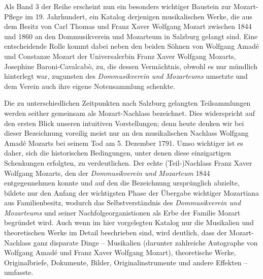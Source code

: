 Als Band 3 der Reihe erscheint nun ein besonders wichtiger Baustein zur Mozart-Pflege im 19. Jahrhundert, ein Katalog derjenigen musikalischen Werke, die aus dem Besitz von Carl Thomas und Franz Xaver Wolfgang Mozart zwischen 1844 und 1860 an den Dommusikverein und Mozarteum in Salzburg gelangt sind. Eine entscheidende Rolle kommt dabei neben den beiden Söhnen von Wolfgang Amadé und Constanze Mozart der Universalerbin Franz Xaver Wolfgang Mozarts, Josephine Baroni-Cavalcabò, zu, die dessen Vermächtnis, obwohl es nur mündlich hinterlegt war, zugunsten des \textit{Dommusikverein und Mozarteums} umsetzte und dem Verein auch ihre eigene Notensammlung schenkte.

Die zu unterschiedlichen Zeitpunkten nach Salzburg gelangten Teilsammlungen werden seither gemeinsam als \glqq Mozart-Nachlass\grqq{} bezeichnet. Dies widerspricht auf den ersten Blick unseren intuitiven Vorstellungen; denn heute denken wir bei dieser Bezeichnung voreilig meist nur an den musikalischen Nachlass Wolfgang Amadé Mozarts bei seinem Tod am 5. Dezember 1791. Umso wichtiger ist es daher, sich die historischen Bedingungen, unter denen diese einzigartigen Schenkungen erfolgten, zu verdeutlichen. Der \glqq echte (Teil-)Nachlass\grqq{} Franz Xaver Wolfgang Mozarts, den der \textit{Dommusikverein und Mozarteum} 1844 entgegennehmen konnte und auf den die Bezeichnung ursprünglich abzielte, bildete nur den Anfang der wichtigsten Phase der Übergabe wichtiger Mozartiana aus Familienbesitz, wodurch das Selbstverständnis des \textit{Dommusikverein und Mozarteums} und seiner Nachfolgeorganistionen als \glqq Erbe\grqq{} der Familie Mozart begründet wird. Auch wenn im hier vorgelegten Katalog nur die Musikalien und theoretischen Werke im Detail beschrieben sind, wird deutlich, dass der \glqq Mozart-Nachlass\grqq{} ganz disparate Dinge – Musikalien (darunter zahlreiche Autographe von Wolfgang Amadé und Franz Xaver Wolfgang Mozart), theoretische Werke, Originalbriefe, Dokumente, Bilder, Originalinstrumente und andere \glqq Effekten\grqq{} – umfasste.

